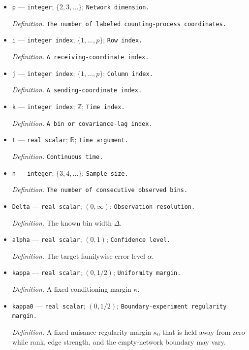 \documentclass{article}
\begin{document}
\begin{itemize}
  \item \texttt{p} --- \texttt{integer}; \(\{2,3,\ldots\}\); \texttt{Network dimension.}
  \par\smallskip\noindent\emph{Definition.} \texttt{The number of labeled counting-\allowbreak{}process coordinates.}
  \item \texttt{i} --- \texttt{integer index}; \(\{1,\ldots,p\}\); \texttt{Row index.}
  \par\smallskip\noindent\emph{Definition.} \texttt{A receiving-\allowbreak{}coordinate index.}
  \item \texttt{j} --- \texttt{integer index}; \(\{1,\ldots,p\}\); \texttt{Column index.}
  \par\smallskip\noindent\emph{Definition.} \texttt{A sending-\allowbreak{}coordinate index.}
  \item \texttt{k} --- \texttt{integer index}; \(\mathbb Z\); \texttt{Time index.}
  \par\smallskip\noindent\emph{Definition.} \texttt{A bin or covariance-\allowbreak{}lag index.}
  \item \texttt{t} --- \texttt{real scalar}; \(\mathbb R\); \texttt{Time argument.}
  \par\smallskip\noindent\emph{Definition.} \texttt{Continuous time.}
  \item \texttt{n} --- \texttt{integer}; \(\{3,4,\ldots\}\); \texttt{Sample size.}
  \par\smallskip\noindent\emph{Definition.} \texttt{The number of consecutive observed bins.}
  \item \texttt{Delta} --- \texttt{real scalar}; \((0,\infty)\); \texttt{Observation resolution.}
  \par\smallskip\noindent\emph{Definition.} The known bin width \(\Delta\).
  \item \texttt{alpha} --- \texttt{real scalar}; \((0,1)\); \texttt{Confidence level.}
  \par\smallskip\noindent\emph{Definition.} The target familywise error level \(\alpha\).
  \item \texttt{kappa} --- \texttt{real scalar}; \((0,1/2)\); \texttt{Uniformity margin.}
  \par\smallskip\noindent\emph{Definition.} A fixed conditioning margin \(\kappa\).
  \item \texttt{kappa0} --- \texttt{real scalar}; \((0,1/2)\); \texttt{Boundary-\allowbreak{}experiment regularity margin.}
  \par\smallskip\noindent\emph{Definition.} A fixed nuisance-regularity margin \(\kappa_0\) that is held away from zero while rank, edge strength, and the empty-network boundary may vary.

\end{itemize}
\end{document}
